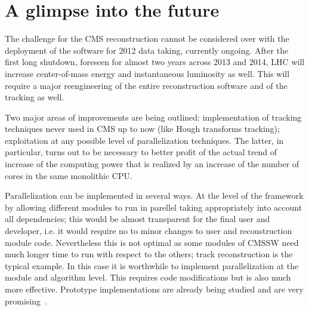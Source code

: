 \section{A glimpse into the future}
\label{glimpse}

The challenge for the CMS reconstruction cannot be considered over
with the deployment of the software for 2012 data taking, currently
ongoing. After the first long shutdown, foreseen for almost two years
across 2013 and 2014, LHC will increase center-of-mass energy
and instantaneous luminosity as well. This will require a major
reengineering of the entire reconstruction software and of the
tracking as well.

Two major areas of improvements are being outlined: implementation of
tracking techniques never used in CMS up to now (like Hough transforms
tracking); exploitation at any possible level of parallelization
techniques. The latter, in particular, turns out to be necessary to
better profit of the actual trend of increase of the computing power
that is realized by an increase of the number of cores in the same
monolithic CPU.

Parallelization can be implemented in several ways. At the level of
the framework by allowing different modules to run in parellel taking
appropriately into account all dependencies; this would be almost
transparent for the final user and developer, i.e. it would require no
to minor changes to user and reconstruction module code. Nevertheless
this is not optimal as some modules of CMSSW need much longer time
to run with respect to the others; track reconstruction is the
typical example. In this case it is worthwhile to implement
parallelization at the module and algorithm level. This requires code
modifications but is also much more effective. Prototype
implementations are already being studied and are very
promising~\cite{parallel}.




